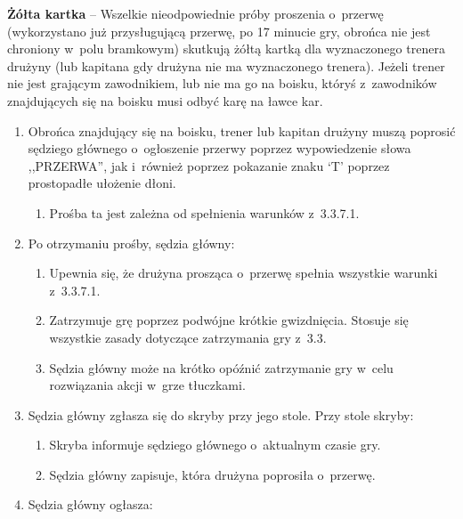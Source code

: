 \documentclass[12pt,a4paper]{article}
\renewcommand{\paragraph}[1]{
  \oldparagraph{#1}%
  \leftskip2.8cm
}
\newcommand\yellowcard[1]{\bgroup\textcolor{darkyellow}{\textbf{#1}}}
\begin{document}
\yellowcard{Żółta kartka} -- Wszelkie nieodpowiednie próby proszenia o~przerwę
(wykorzystano już przysługującą przerwę, po 17 minucie gry, obrońca nie jest chroniony w~polu bramkowym) skutkują żółtą kartką dla
wyznaczonego trenera drużyny (lub kapitana gdy drużyna nie ma wyznaczonego trenera). Jeżeli trener nie jest grającym
zawodnikiem, lub nie ma go na boisku, któryś z~zawodników znajdujących
się na boisku musi odbyć karę na ławce kar.

\paragraph{Procedura przerwy}

\begin{enumerate}
	\item
	      Obrońca znajdujący się na boisku, trener lub kapitan drużyny muszą
	      poprosić sędziego głównego o~ogłoszenie przerwy poprzez wypowiedzenie
	      słowa ,,PRZERWA'', jak i~również poprzez pokazanie znaku `T' poprzez
	      prostopadłe ułożenie dłoni.

	      \begin{enumerate}
		      \item
		            Prośba ta jest zależna od spełnienia warunków z~3.3.7.1.
	      \end{enumerate}
	\item
	      Po otrzymaniu prośby, sędzia główny:

	      \begin{enumerate}
		      \item
		            Upewnia się, że drużyna prosząca o~przerwę spełnia wszystkie warunki
		            z~3.3.7.1.
		      \item
		            Zatrzymuje grę poprzez podwójne krótkie gwizdnięcia. Stosuje się
		            wszystkie zasady dotyczące zatrzymania gry z~3.3.
		      \item
		            Sędzia główny może na krótko opóźnić zatrzymanie gry w~celu
		            rozwiązania akcji w~grze tłuczkami.
	      \end{enumerate}
	\item
	      Sędzia główny zgłasza się do skryby przy jego stole. Przy stole
	      skryby:

	      \begin{enumerate}
		      \item
		            Skryba informuje sędziego głównego o~aktualnym czasie gry.
		      \item
		            Sędzia główny zapisuje, która drużyna poprosiła o~przerwę.
	      \end{enumerate}
	\item
	      Sędzia główny ogłasza:


\end{enumerate}
\end{document}
